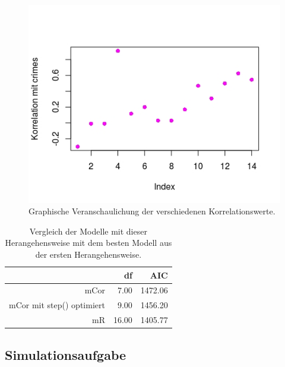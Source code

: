 \begin{figure}
\centering
\includegraphics[scale=.7]{./jpgs/corc.jpeg}
\caption[Veranschaulichung Korrelationswerte]{Graphische Veranschaulichung der verschiedenen Korrelationswerte.}
\label{fig:cor}
\end{figure} 

\begin{table}[ht]
\centering
\begin{tabular}{rrr}
  \hline
 & df & AIC \\ 
  \hline
mCor & 7.00 & 1472.06 \\ 
  mCor mit step() optimiert & 9.00 & 1456.20 \\ 
  mR & 16.00 & 1405.77 \\ 
   \hline
\end{tabular}
\caption[Vergleich cor-Ergebnis mit Besten]{Vergleich der Modelle mit dieser Herangehensweise mit dem besten Modell aus der ersten Herangehensweise.}
\label{tab:co2}
\end{table}

\newpage 
\subsection{Simulationsaufgabe}
